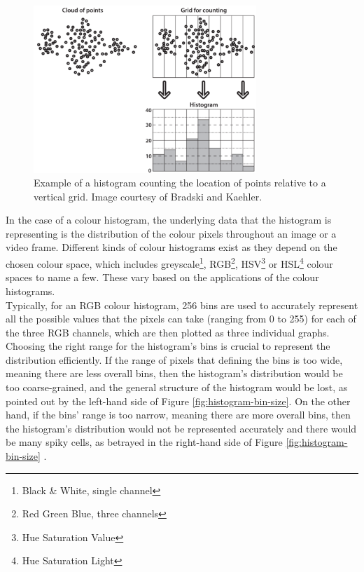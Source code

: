 \begin{figure}[h]
\centerline{\includegraphics[width=0.75\textwidth]{figures/litsurvey/histogram_general_example.png}}
\caption{\label{fig:histogram-general-example}Example of a histogram counting the location of points relative to a vertical grid. Image courtesy of Bradski and Kaehler.}
\end{figure}

In the case of a colour histogram, the underlying data that the histogram is representing is the distribution of the colour pixels throughout an image or a video frame. Different kinds of colour histograms exist as they depend on the chosen colour space, which includes greyscale\footnote{Black \& White, single channel}, RGB\footnote{Red Green Blue, three channels}, HSV\footnote{Hue Saturation Value} or HSL\footnote{Hue Saturation Light} colour spaces to name a few. These vary based on the applications of the colour histograms.\\

Typically, for an RGB colour histogram, 256 bins are used to accurately represent all the possible values that the pixels can take (ranging from 0 to 255) for each of the three RGB channels, which are then plotted as three individual graphs. Choosing the right range for the histogram's bins is crucial to represent the distribution efficiently. If the range of pixels that defining the bins is too wide, meaning there are less overall bins, then the histogram's distribution would be too coarse-grained, and the general structure of the histogram would be lost, as pointed out by the left-hand side of Figure \ref{fig:histogram-bin-size}. On the other hand, if the bins' range is too narrow, meaning there are more overall bins, then the histogram's distribution would not be represented accurately and there would be many spiky cells, as betrayed in the right-hand side of Figure \ref{fig:histogram-bin-size} \cite{bradski2008opencv}.

